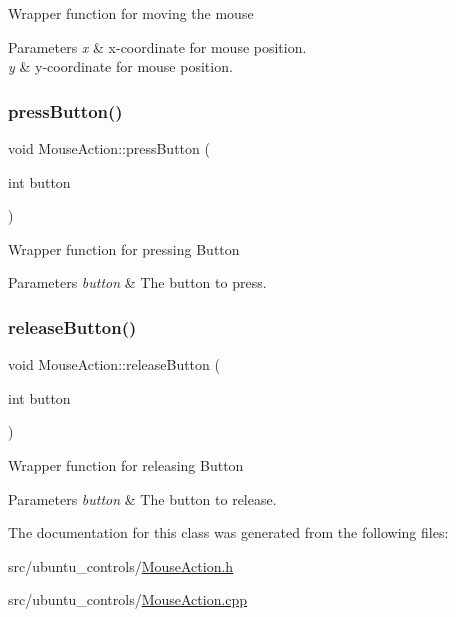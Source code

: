 Wrapper function for moving the mouse


\begin{DoxyParams}{Parameters}
{\em x} & x-\/coordinate for mouse position. \\
\hline
{\em y} & y-\/coordinate for mouse position. \\
\hline
\end{DoxyParams}
\mbox{\label{classUbuntuController_1_1MouseAction_aa017b86a7e358e7a74a8ec50a5a191cf}} 
\subsubsection{\texorpdfstring{press\+Button()}{pressButton()}}
{\footnotesize\ttfamily void Mouse\+Action\+::press\+Button (\begin{DoxyParamCaption}\item[{int}]{button }\end{DoxyParamCaption})}

Wrapper function for pressing Button


\begin{DoxyParams}{Parameters}
{\em button} & The button to press. \\
\hline
\end{DoxyParams}
\mbox{\label{classUbuntuController_1_1MouseAction_ab1ac193e88baf8614c55ca2fa7a3b430}} 
\subsubsection{\texorpdfstring{release\+Button()}{releaseButton()}}
{\footnotesize\ttfamily void Mouse\+Action\+::release\+Button (\begin{DoxyParamCaption}\item[{int}]{button }\end{DoxyParamCaption})}

Wrapper function for releasing Button


\begin{DoxyParams}{Parameters}
{\em button} & The button to release. \\
\hline
\end{DoxyParams}


The documentation for this class was generated from the following files\+:\begin{DoxyCompactItemize}
\item 
src/ubuntu\+\_\+controls/\hyperlink{MouseAction_8h}{Mouse\+Action.\+h}\item 
src/ubuntu\+\_\+controls/\hyperlink{MouseAction_8cpp}{Mouse\+Action.\+cpp}\end{DoxyCompactItemize}
